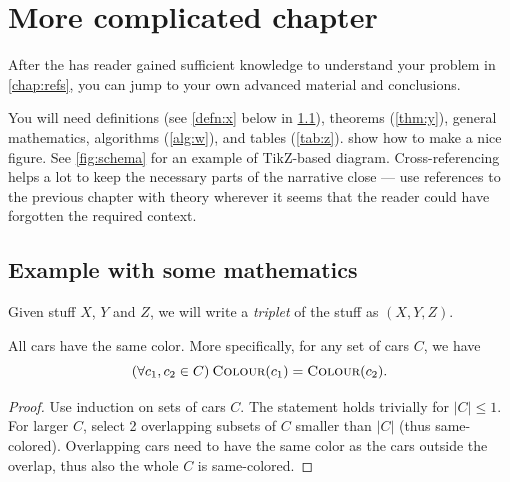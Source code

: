 \iffalse
\chapter{More complicated chapter}
\label{chap:math}

After the has reader gained sufficient knowledge to understand your problem in \cref{chap:refs}, you can jump to your own advanced material and conclusions.

You will need definitions (see \cref{defn:x} below in \cref{sec:demo}), theorems (\cref{thm:y}), general mathematics, algorithms (\cref{alg:w}), and tables (\cref{tab:z}).  show how to make a nice figure. See \cref{fig:schema} for an example of TikZ-based diagram. Cross-referencing helps a lot to keep the necessary parts of the narrative close --- use references to the previous chapter with theory wherever it seems that the reader could have forgotten the required context.

\section{Example with some mathematics}
\label{sec:demo}

\begin{defn}[Triplet]\label{defn:x}
Given stuff $X$, $Y$ and $Z$, we will write a \emph{triplet} of the stuff as $(X,Y,Z)$.
\end{defn}

\newcommand{\Col}{\textsc{Colour}}

\begin{thm}\label{thm:y}
All cars have the same color. More specifically, for any set of cars $C$, we have
$$(\forall c_1, c_2 \in C)\:\Col(c_1) = \Col(c_2).$$
\end{thm}

\begin{proof}
Use induction on sets of cars $C$. The statement holds trivially for $|C|\leq1$. For larger $C$, select 2 overlapping subsets of $C$ smaller than $|C|$ (thus same-colored). Overlapping cars need to have the same color as the cars outside the overlap, thus also the whole $C$ is same-colored.
\end{proof}

